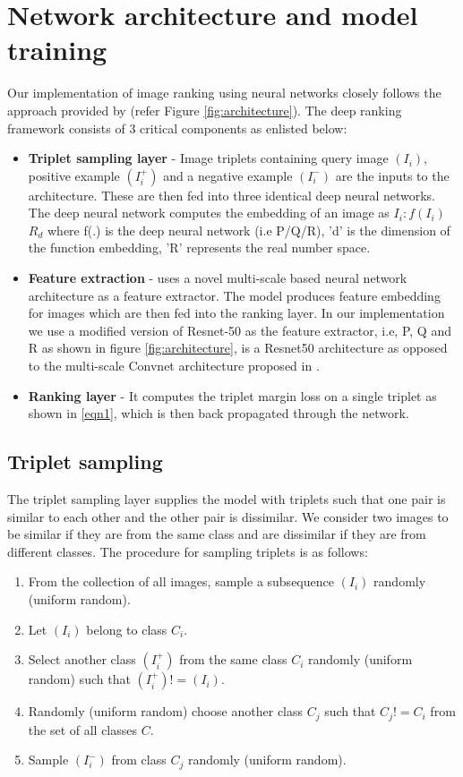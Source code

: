 \section{Network architecture and model training}
Our implementation of image ranking using neural networks closely follows the approach provided by \cite{wang2014learning} (refer Figure \ref{fig:architecture}). The deep ranking framework consists of 3 critical components as enlisted below:
 

\begin{itemize}
    \item \textbf{Triplet sampling layer} - Image triplets containing query image $(I_{i})$, positive example $(I_{i}^{+})$ and a negative example $(I_{i}^{-})$ are the inputs to the architecture. These are then fed into three identical deep neural networks. The deep neural network computes the embedding of an image as  $I_{i}:f(I_{i})$\in $R_{d}$ where f(.) is the deep neural network (i.e P/Q/R), 'd' is the dimension of the function embedding, 'R' represents the real number space.
    \item \textbf{Feature extraction} - \cite{wang2014learning} uses a novel multi-scale based neural network architecture as a feature extractor. The model produces feature embedding for images which are then fed into the ranking layer. In our implementation we use a modified version of Resnet-50 as the feature extractor, i.e, P, Q and R as shown in figure \ref{fig:architecture}, is a Resnet50 architecture as opposed to the multi-scale Convnet architecture proposed in \cite{wang2014learning}.
    \item \textbf{Ranking layer} - It computes the triplet margin loss on a single triplet as shown in \ref{eqn1}, which is then back propagated through the network. 
    
\end{itemize}

\subsection{Triplet sampling}
The triplet sampling layer supplies the model with triplets such that one pair is similar to each other and the other pair is dissimilar. We consider two images to be similar if they are from the same class and are dissimilar if they are from different classes. The procedure for sampling triplets is as follows:

\begin{enumerate}
    \item From the collection of all images, sample a subsequence $(I_{i})$ randomly (uniform random). 
    \item Let $(I_{i})$ belong to class $C_i$.
    \item Select another class $(I_{i}^{+})$ from the same class $C_i$ randomly (uniform random) such that $(I_{i}^{+}) != (I_{i})$.
    \item Randomly (uniform random) choose another class $C_j$ such that $C_j != C_i$ from the set of all classes $C$.
    \item Sample $(I_{i}^{-})$ from class $C_j$ randomly (uniform random).
\end{enumerate}


